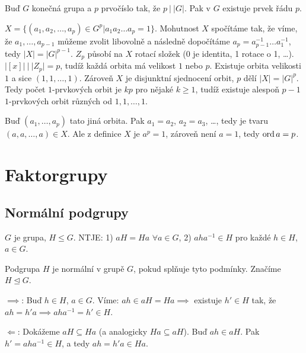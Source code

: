 \documentclass[12pt]{article}                   %
\begin{document}
        \begin{veta}[Cauchyova]
            Buď $G$ konečná grupa a $p$ prvočíslo tak, že $p\ |\ |G|$. Pak v $G$ existuje prvek řádu $p$.

            \begin{dukazin}
                $X = \{(a_1, a_2, …, a_p) \in G^{p} | a_1a_2…a_p = 1\}$. Mohutnost $X$ spočítáme tak, že víme, že $a_1, …, a_{p-1}$ můžeme zvolit libovolně a následně dopočítáme $a_p = a_{p-1}^{-1}…a_1^{-1}$, tedy $|X| = |G|^{p-1}$. $Z_p$ působí na $X$ rotací složek (0 je identita, 1 rotace o 1, …). $|[x]|\ |\ |Z_p| = p$, tudíž každá orbita má velikost $1$ nebo $p$. Existuje orbita velikosti $1$ a sice $(1, 1, …, 1)$. Zároveň $X$ je disjunktní sjednocení orbit, $p$ dělí $|X| = |G|^p$. Tedy počet $1$-prvkových orbit je $kp$ pro nějaké $k ≥ 1$, tudíž existuje alespoň $p-1$ $1$-prvkových orbit různých od $1, 1, …, 1$.

                Buď $(a_1, …, a_p)$ tato jiná orbita. Pak $a_1 = a_2$, $a_2 = a_3$, …, tedy je tvaru $(a, a, …, a) \in X$. Ale z definice $X$ je $a^p = 1$, zároveň není $a = 1$, tedy $\operatorname{ord} a = p$.
            \end{dukazin}
        \end{veta}

\section{Faktorgrupy}
    \subsection{Normální podgrupy}
        \begin{tvrzeni}
            $G$ je grupa, $H ≤ G$. NTJE:
            1) $aH = Ha$ $\forall a \in G$,
            2) $aha^{-1} \in H$ pro každé $h \in H$, $a \in G$.
        \end{tvrzeni}

        \begin{definicein}
            Podgrupa $H$ je normální v grupě $G$, pokud splňuje tyto podmínky. Značíme $H \trianglelefteq G$.
        \end{definicein}

        \begin{dukazin}
            $\implies$: Buď $h \in H$, $a \in G$. Víme: $ah \in aH = Ha \implies$ existuje $h' \in H$ tak, že $ah = h'a \implies aha^{-1} = h' \in H$.

            $\Leftarrow$: Dokážeme $aH \subseteq Ha$ (a analogicky $Ha \subseteq aH$). Buď $ah \in aH$. Pak $h' = aha^{-1} \in H$, a tedy $ah = h'a \in Ha$.
        \end{dukazin}
\end{document}
